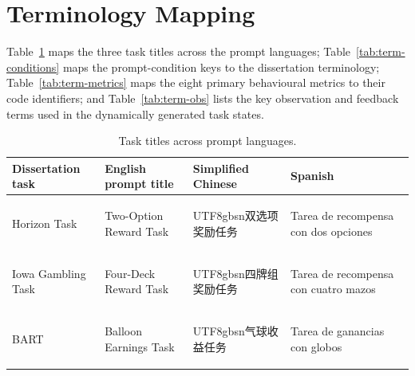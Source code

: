 \documentclass[logo,msc,inf]{infthesis}       %
\begin{document}
\section{Terminology Mapping}
\label{app:terminology}

Table~\ref{tab:term-tasks} maps the three task titles across the prompt languages; Table~\ref{tab:term-conditions} maps the prompt-condition keys to the dissertation terminology; Table~\ref{tab:term-metrics} maps the eight primary behavioural metrics to their code identifiers; and Table~\ref{tab:term-obs} lists the key observation and feedback terms used in the dynamically generated task states.

\begin{table}[htbp]
\centering
\caption{Task titles across prompt languages.}
\label{tab:term-tasks}
\setlength{\tabcolsep}{4pt}%
\begin{tabular}{@{}>{\raggedright\arraybackslash}p{2.8cm}>{\raggedright\arraybackslash}p{3.6cm}>{\raggedright\arraybackslash}p{2.4cm}>{\raggedright\arraybackslash}p{3.8cm}@{}}
\toprule
\textbf{Dissertation task} & \textbf{English prompt title} & \textbf{Simplified Chinese} & \textbf{Spanish} \\
\midrule
Horizon Task & Two-Option Reward Task & {\begin{CJK}{UTF8}{gbsn}双选项奖励任务\end{CJK}} & Tarea de recompensa con dos opciones \\
Iowa Gambling Task & Four-Deck Reward Task & {\begin{CJK}{UTF8}{gbsn}四牌组奖励任务\end{CJK}} & Tarea de recompensa con cuatro mazos \\
BART & Balloon Earnings Task & {\begin{CJK}{UTF8}{gbsn}气球收益任务\end{CJK}} & Tarea de ganancias con globos \\
\bottomrule
\end{tabular}
\end{table}
\end{document}

